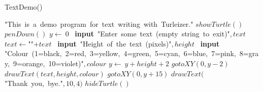 \documentclass[a4paper,10pt]{article}
\begin{document}
\begin{algorithm}
\caption{TextDemo()}
\begin{algorithmic}[5]

\STATE {}
\STATE {}
\STATE {}
\STATE {}
  \PRINT\(\)"{}This\ is\ a\ demo\ program\ for\ text\ writing\ with\ Turleizer."{}\(\)
  \STATE \(showTurtle()\)
  \STATE \(penDown()\)
  \STATE \(y\gets\ 0\)
  \REPEAT
    \STATE\ \textbf{input}\ \(\)"{}Enter\ some\ text\ (empty\ string\ to\ exit)"{}\(,text\)
    \STATE \(text\gets\)"{}"{}\(+text\)
      \REPEAT
        \STATE\ \textbf{input}\ \(\)"{}Height\ of\ the\ text\ (pixels)"{}\(,height\)
      \REPEAT
        \STATE\ \textbf{input}\ \(\)"{}Colour\ (1=black,\ 2=red,\ 3=yellow,\ 4=green,\ 5=cyan,\ 6=blue,\ 7=pink,\ 8=gray,\ 9=orange,\ 10=violet)"{}\(,colour\)
      \STATE \(y\gets\ y+height+2\)
      \STATE \(gotoXY(0,y-2)\)
      \STATE \(drawText(text,height,colour)\)
    \ENDIF
  \STATE \(gotoXY(0,y+15)\)
  \STATE \(drawText(\)"{}Thank\ you,\ bye."{}\(,10,4)\)
  \STATE \(hideTurtle()\)

\end{algorithmic}
\end{algorithm}
\end{document}
